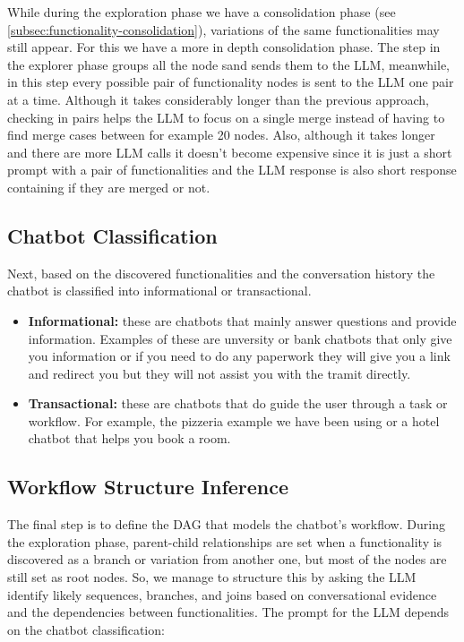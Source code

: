 While during the exploration phase we have a consolidation phase
(see \autoref{subsec:functionality-consolidation}),
variations of the same functionalities may still appear.
For this we have a more in depth consolidation phase.
The step in the explorer phase groups all the node
sand sends them to the \ac{LLM},
meanwhile, in this step every possible pair of functionality nodes
is sent to the \ac{LLM} one pair at a time.
Although it takes considerably longer than the previous approach,
checking in pairs helps the \ac{LLM} to focus on a single merge
instead of having to find merge cases between for example 20 nodes.
Also, although it takes longer and there are more \ac{LLM} calls
it doesn't become expensive since it is just a short prompt
with a pair of functionalities
and the \ac{LLM} response is also short response
containing if they are merged or not.

\subsection{Chatbot Classification}

Next, based on the discovered functionalities
and the conversation history
the chatbot is classified into informational or transactional.

\begin{itemize}
  \item \textbf{Informational:}
    these are chatbots that mainly answer questions and provide information.
    Examples of these are unversity or bank chatbots that only give you information
    or if you need to do any paperwork they will give you a link and redirect you
    but they will not assist you with the tramit directly.

  \item \textbf{Transactional:}
    these are chatbots that do guide the user
    through a task or workflow.
    For example, the pizzeria example we have been using
    or a hotel chatbot that helps you book a room.
\end{itemize}

\subsection{Workflow Structure Inference}

The final step is to define the \acl{DAG}
that models the chatbot's workflow.
During the exploration phase,
parent-child relationships are set
when a functionality is discovered as a branch or variation from another one,
but most of the nodes are still set as root nodes.
So, we manage to structure this by asking the \ac{LLM}
identify likely sequences, branches, and joins
based on conversational evidence and the dependencies between functionalities.
The prompt for the LLM depends on the chatbot classification:

